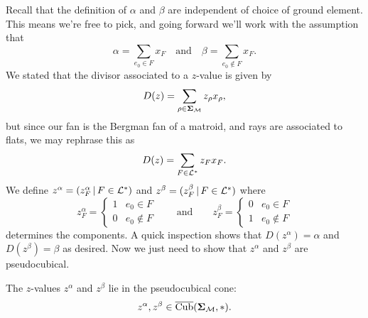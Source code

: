 \documentclass[12pt,oneside]{../../sfsuthesis}
\begin{document}
Recall that the definition of \( \alpha \) and \( \beta \) are independent of choice of ground element.
This means we're free to pick, and going forward we'll work with the assumption that
\[
    \alpha = \sum_{e_0 \in F} x_F \quad \text{and} \quad \beta = \sum_{e_0 \notin F} x_F.
\]
We stated that the divisor associated to a \( z \)-value is given by
\[
    D(z) = \sum_{\rho \in {\bm{\Sigma}}_{\mathcal{M}}} z_\rho x_\rho,
\]
but since our fan is the Bergman fan of a matroid, and rays are associated to flats, we may rephrase this as
\[
    D(z) = \sum_{F \in \mathcal{L}^\ast} z_F x_F.
\]
We define \( z^\alpha = (z^\alpha_F \, | \, F \in \mathcal{L}^\ast) \) and \( z^\beta = (z^\beta_F \, | \, F \in \mathcal{L}^\ast) \) where
\[
    z^\alpha_F = \begin{cases}
        1 & e_0 \in F    \\
        0 & e_0 \notin F
    \end{cases}
    \quad \quad \text{and} \quad \quad
    z^\beta_F= \begin{cases}
        0 & e_0 \in F    \\
        1 & e_0 \notin F
    \end{cases}
\]
determines the components.
A quick inspection shows that \( D(z^\alpha) = \alpha \) and \( D(z^\beta) = \beta \) as desired.
Now we just need to show that \( z^\alpha \) and \( z^\beta \) are pseudocubical.
\begin{proposition}
    The \( z \)-values \(  z^\alpha \) and \( z^\beta \) lie in the pseudocubical cone:
    \[
        z^\alpha, z^\beta \in  \operatorname{\overline{Cub}}({\bm{\Sigma}}_{\mathcal{M}}, \ast).
    \]
\end{proposition}
\end{document}
